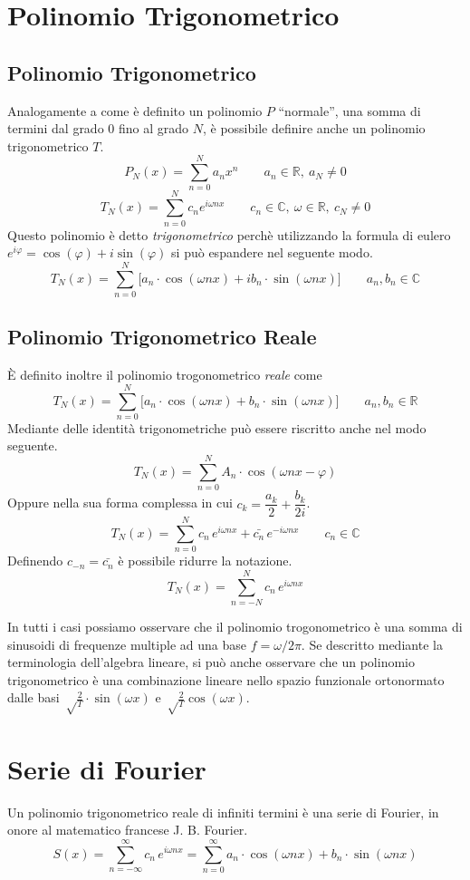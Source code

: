\section{Polinomio Trigonometrico}
\subsection{Polinomio Trigonometrico}
Analogamente a come \`e definito un polinomio \(P\) ``normale'', una somma di
termini dal grado 0 fino al grado \(N\), \`e possibile definire anche un
polinomio trigonometrico \(T\).
\[
    P_N(x) = \sum_{n=0}^N a_n x^n \qquad a_n \in \mathbb{R},~ a_N \neq 0
\]
\[
    T_N(x) = \sum_{n=0}^N c_n e^{i\omega nx} 
        \qquad c_n \in\mathbb{C},~\omega\in\mathbb{R}, ~ c_N \neq 0
\]
Questo polinomio \`e detto \emph{trigonometrico} perch\`e utilizzando la
formula di eulero \(e^{i\varphi} = \cos(\varphi) + i\sin(\varphi)\) si pu\`o
espandere nel seguente modo.
\[
    T_N(x) = \sum_{n=0}^N\big [a_n\cdot\cos(\omega nx) + ib_n\cdot\sin(\omega nx)]
    \qquad a_n, b_n \in \mathbb{C}
\]

\subsection{Polinomio Trigonometrico Reale} \label{sec:real-trig}
\`E definito inoltre il polinomio trogonometrico \emph{reale} come
\[
    T_N(x) = \sum_{n=0}^N\big [a_n\cdot\cos(\omega nx) + b_n\cdot\sin(\omega nx)]
    \qquad a_n, b_n \in \mathbb{R}
\]
Mediante delle identit\`a trigonometriche pu\`o essere riscritto anche nel
modo seguente.
\[
    T_N(x) = \sum_{n=0}^N A_n\cdot\cos(\omega nx - \varphi)
\]
Oppure nella sua forma complessa in cui \(c_k = \dfrac{a_k}{2} + \dfrac{b_k}{2i}\).
\[
    T_N(x) = \sum_{n=0}^N c_n\,e^{i\omega nx} + \bar{c_n}\,e^{-i\omega nx}
    \qquad c_n \in \mathbb{C}
\]
Definendo \(c_{-n} = \bar{c_n}\) \`e possibile ridurre la notazione.
\[
    T_N(x) = \sum_{n=-N}^N c_n\,e^{i\omega nx}
\]

In tutti i casi possiamo osservare che il polinomio trogonometrico \`e una
somma di sinusoidi di frequenze multiple ad una base \(f = \omega/2\pi\).  Se
descritto mediante la terminologia dell'algebra lineare, si pu\`o anche
osservare che un polinomio trigonometrico \`e una combinazione lineare nello
spazio funzionale ortonormato dalle basi \(\sqrt\frac{2}{T}\cdot\sin(\omega
x)\) e \(\sqrt\frac{2}{T} \cos(\omega x)\).


\section{Serie di Fourier}
Un polinomio trigonometrico reale di infiniti termini \`e una serie di Fourier,
in onore al matematico francese  J. B. Fourier.
\[
	S(x) = \sum_{n=-\infty}^\infty c_n\,e^{i\omega nx} 
         = \sum_{n=0}^\infty a_n\cdot\cos(\omega nx) + b_n\cdot\sin(\omega nx)
\]

